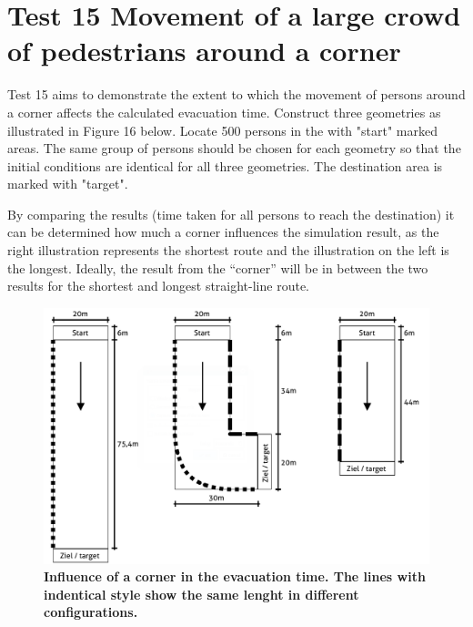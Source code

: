 \section*{Test 15  Movement of a large crowd of pedestrians around a corner}

Test 15 aims to demonstrate the extent to which the movement of persons around a corner affects the calculated evacuation time. Construct three geometries as illustrated in Figure 16 below. Locate 500 persons in the with "start" marked areas. The same group of persons should be chosen for each geometry so that the initial conditions are identical for all three geometries. The destination area is marked with "target".


\noindent
By comparing the results (time taken for all persons to reach the destination) it can be determined how much a corner influences the simulation result, as the right illustration represents the shortest route and the illustration on the left is the longest. Ideally, the result from the “corner” will be in between the two results for the shortest and longest straight-line route.



\begin{figure}[h]
	\centering
	\includegraphics[scale=0.40]{test_description/Corridor_test_15.png}
	\caption{\footnotesize \textbf{Influence of a corner in the evacuation time. The lines with indentical style show the same lenght in different configurations.}}
\end{figure}
